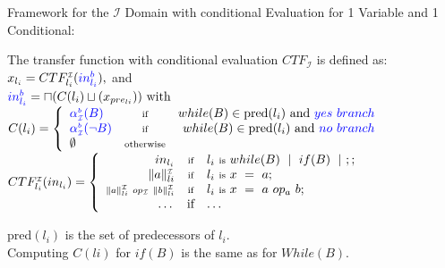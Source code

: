 \begin{frame}{Framework for the $\mathcal{I}$ Domain with conditional Evaluation for 1 Variable and 1 Conditional:}
	
\scriptsize The transfer function with conditional evaluation $CTF_\mathcal{I}$ is defined as:\\ 
$ x_{l_i}= CTF^{\scriptscriptstyle \mathcal{I}}_{l_i}({\color{blue}in_{l_i}^b}),$ and \\ 
$ {\color{blue}in_{l_i}^b}= \sqcap (C(l_i) \sqcup(x_{pre_{li}})) ~\text{with}$\\

\xxx
$C(l_i)= \left\{ 
\begin{array}{lcr} {\color{blue}\alpha_{\scriptscriptstyle \mathcal{I}}^{\scriptscriptstyle b} (B)} & \mbox{\scriptsize if}& \textstyle while(B) \in \mbox{pred}(l_i)~ \mbox{and}~{\color{blue} yes~ branch} \\
{\color{blue}\alpha_{\scriptscriptstyle \mathcal{I}}^{\scriptscriptstyle b} (\neg B)} & \mbox{\scriptsize if}& \textstyle while(B) \in \mbox{pred}(l_i)~ \mbox{and}~{\color{blue} no~ branch} \\
\emptyset  & \mbox{\scriptsize otherwise} &  
\end{array}\right.$ \\

\xxx
$  CTF^{\scriptscriptstyle \mathcal{I}}_{l_i}(in_{l_i}) =     \left\{ \begin{array}{rcl}
\textstyle	in_{l_i} &  \mbox{\scriptsize if}& \textstyle l_i~\text{\scriptsize is}~while(B)~\mid~ if(B) ~\mid~;;   \\
\textstyle	\|a\|_{li}^{\scriptscriptstyle \mathcal{I}}  & \mbox{\scriptsize if} & \textstyle l_i~\mbox{\scriptsize is}~x~=~a; \\
\scriptstyle	\|a\|_{li}^{\scriptscriptstyle \mathcal{I}}~op_\mathcal{I}~ \|b\|_{li}^{\scriptscriptstyle \mathcal{I}}  & \mbox{\scriptsize if} &  \textstyle l_i~\mbox{\scriptsize is}~x~=~a~op_a~b; \\
\dots & \mbox{if} & \dots
\end{array}\right.$
\newline

\xxx
pred$(l_i)$ is the set of predecessors of $l_i$.\\
Computing $C(li)$  for $if(B)$ is the same as for $While(B)$.

\end{frame}

